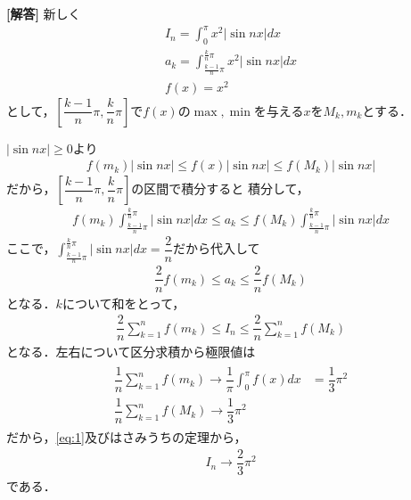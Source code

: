 \documentclass[../../main.tex]{subfiles}
\begin{document}
\begin{oframed}
  
\end{oframed}

{\bf [解答]}
新しく
\begin{align}
  I_n=\displaystyle\int_0^\pi x^2|\sin nx|dx \\
  a_k=\displaystyle\int_{\frac{k-1}{n}\pi}^{\frac{k}{n}\pi}x^2|\sin nx|dx \\
  f(x)=x^2
\end{align}
として，$\left[\dfrac{k-1}{n}\pi,\dfrac{k}{n}\pi\right]$で$f(x)$の$\max,\min$を与える$x$を$M_k,m_k$とする．

$|\sin nx|\ge0$より
\begin{align}
  f(m_k)|\sin nx|\le f(x)|\sin nx|\le f(M_k)|\sin nx|
\end{align}
だから，$\left[\dfrac{k-1}{n}\pi,\dfrac{k}{n}\pi\right]$の区間で積分すると
積分して，
\begin{align}
  f(m_k)\int_{\frac{k-1}{n}\pi}^{\frac{k}{n}\pi}|\sin nx|dx\le a_k\le f(M_k)\int_{\frac{k-1}{n}\pi}^{\frac{k}{n}\pi}|\sin nx|dx
\end{align}
ここで，$\displaystyle\int_{\frac{k-1}{n}\pi}^{\frac{k}{n}\pi}|\sin nx|dx=\dfrac{2}{n}$だから代入して
\begin{align}
  \dfrac{2}{n}f(m_k)\le a_k\le\dfrac{2}{n}f(M_k)
\end{align}
となる．$k$について和をとって，
\begin{align}
  \dfrac{2}{n}\sum_{k=1}^nf(m_k)\le I_n\le\dfrac{2}{n}\sum_{k=1}^nf(M_k) \label{eq:1}
\end{align}
となる．左右について区分求積から極限値は
\begin{align}
  \begin{split}
    \dfrac{1}{n}\sum_{k=1}^nf(m_k)\longrightarrow\dfrac{1}{\pi}\int_0^\pi f(x)dx&=\dfrac{1}{3}\pi^2 \\
    \dfrac{1}{n}\sum_{k=1}^nf(M_k)\longrightarrow\dfrac{1}{3}\pi^2
  \end{split}
\end{align}
だから，\cref{eq:1}及びはさみうちの定理から，
\begin{align}
  I_n\longrightarrow\dfrac{2}{3}\pi^2
\end{align}
である．

\newpage
\end{document}
